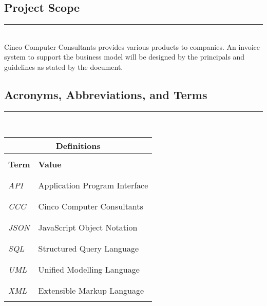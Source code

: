\documentclass[]{article}
\newcommand{\HRule}{\rule{\linewidth}{0.5mm}}
\begin{document}
	
	\subsection{Project Scope}
	\HRule \\[0.5cm]
	Cinco Computer Consultants provides various products to companies. An invoice system 
	to support the business model will be designed by the principals and guidelines as 
	stated by the document.
	
	
	\subsection{Acronyms, Abbreviations, and Terms}
	\HRule \\[0.5cm]
	\begin{longtable}{|l|l|}			
		\multicolumn{2}{c}{\LARGE \textbf{Definitions}} \\
			
		\hline
		& \\
		\textbf{Term} & \textbf{Value} \\
		& \\
		\hline
			
		& \\
		\emph{API} & Application Program Interface \\
		& \\
		\hline
			
		& \\
		\emph{CCC} & Cinco Computer Consultants \\
		& \\
		\hline
			
		& \\
		\emph{JSON} & JavaScript Object Notation \\
		& \\
		\hline
			
		& \\
		\emph{SQL} & Structured Query Language \\
		& \\			
		\hline
			
		& \\
		\emph{UML} & Unified Modelling Language \\
		& \\
		\hline
			
		& \\
		\emph{XML} & Extensible Markup Language \\
		& \\
		\hline
			
	\end{longtable}
	
\end{document}
